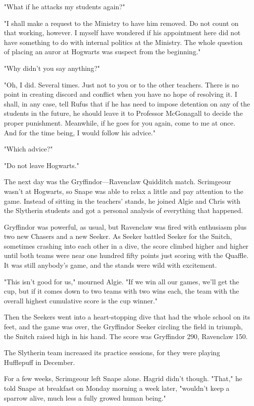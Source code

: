 "What if he attacks my students again?"

"I shall make a request to the Ministry to have him removed. Do not count on that working, however. I myself have wondered if his appointment here did not have something to do with internal politics at the Ministry. The whole question of placing an auror at Hogwarts was suspect from the beginning."

"Why didn't you say anything?"

"Oh, I did. Several times. Just not to you or to the other teachers. There is no point in creating discord and conflict when you have no hope of resolving it. I shall, in any case, tell Rufus that if he has need to impose detention on any of the students in the future, he should leave it to Professor McGonagall to decide the proper punishment. Meanwhile, if he goes for you again, come to me at once. And for the time being, I would follow his advice."

"Which advice?"

"Do not leave Hogwarts."

The next day was the Gryffindor—Ravenclaw Quidditch match. Scrimgeour wasn't at Hogwarts, so Snape was able to relax a little and pay attention to the game. Instead of sitting in the teachers' stands, he joined Algie and Chris with the Slytherin students and got a personal analysis of everything that happened.

Gryffindor was powerful, as usual, but Ravenclaw was fired with enthusiasm plus two new Chasers and a new Seeker. As Seeker battled Seeker for the Snitch, sometimes crashing into each other in a dive, the score climbed higher and higher until both teams were near one hundred fifty points just scoring with the Quaffle. It was still anybody's game, and the stands were wild with excitement.

"This isn't good for us," mourned Algie. "If we win all our games, we'll get the cup, but if it comes down to two teams with two wins each, the team with the overall highest cumulative score is the cup winner."

Then the Seekers went into a heart-stopping dive that had the whole school on its feet, and the game was over, the Gryffindor Seeker circling the field in triumph, the Snitch raised high in his hand. The score was Gryffindor 290, Ravenclaw 150.

The Slytherin team increased its practice sessions, for they were playing Hufflepuff in December.

For a few weeks, Scrimgeour left Snape alone. Hagrid didn't though. "That," he told Snape at breakfast on Monday morning a week later, "wouldn't keep a sparrow alive, much less a fully growed human being."

